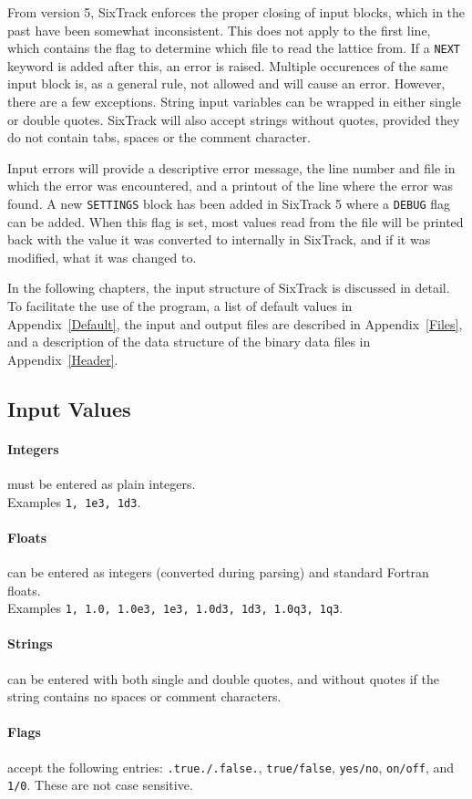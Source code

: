 From version 5, SixTrack enforces the proper closing of input blocks, which in the past have been somewhat inconsistent.
This does not apply to the first line, which contains the flag to determine which file to read the lattice from.
If a \texttt{NEXT} keyword is added after this, an error is raised.
Multiple occurences of the same input block is, as a general rule, not allowed and will cause an error.
However, there are a few exceptions.
String input variables can be wrapped in either single or double quotes.
SixTrack will also accept strings without quotes, provided they do not contain tabs, spaces or the comment character.

Input errors will provide a descriptive error message, the line number and file in which the error was encountered, and a printout of the line where the error was found.
A new \texttt{SETTINGS} block has been added in SixTrack 5 where a \texttt{DEBUG} flag can be added.
When this flag is set, most values read from the file will be printed back with the value it was converted to internally in SixTrack, and if it was modified, what it was changed to.

In the following chapters, the input structure of SixTrack is discussed in detail.
To facilitate the use of the program, a list of default values in Appendix~\ref{Default}, the input and output files are described in Appendix~\ref{Files}, and a description of the data structure of the binary data files in Appendix~\ref{Header}.

\subsection{Input Values} \label{sec:invals}

\paragraph{Integers} must be entered as plain integers.\\
Examples \texttt{1, 1e3, 1d3}.
\paragraph{Floats} can be entered as integers (converted during parsing) and standard Fortran floats.\\
Examples \texttt{1, 1.0, 1.0e3, 1e3, 1.0d3, 1d3, 1.0q3, 1q3}.
\paragraph{Strings} can be entered with both single and double quotes, and without quotes if the string contains no spaces or comment characters.
\paragraph{Flags} accept the following entries: \texttt{.true./.false.}, \texttt{true/false}, \texttt{yes/no}, \texttt{on/off}, and \texttt{1/0}. These are not case sensitive.
